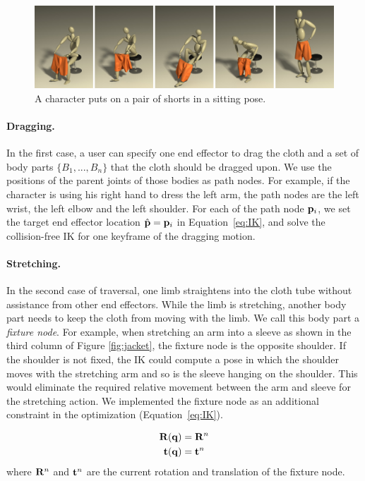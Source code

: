 \begin{figure}[!t]
  \centering
  \includegraphics[width=\textwidth]{images/shortsSitting}
  \caption{A character puts on a pair of shorts in a sitting pose.}
  \label{fig:shorts1}
\end{figure}



\paragraph{Dragging.} In the first case, a user can specify one end effector to drag the cloth and a set of body parts $\{B_1 ,..., B_n\}$ that the cloth should be dragged upon. We use the positions of the parent joints of those bodies as path nodes. For example, if the character is using his right hand to dress the left arm, the path nodes are the left wrist, the left elbow and the left shoulder. For each of the path node $\mathbf{p}_i$, we set the target end effector location $\hat{\mathbf{p}}=\mathbf{p}_i$ in Equation~\ref{eq:IK}, and solve the collision-free IK for one keyframe of the dragging motion. 

\paragraph{Stretching.} In the second case of traversal, one limb straightens into the cloth tube without assistance from other end effectors. While the limb is stretching, another body part needs to keep the cloth from moving with the limb. We call this body part a \emph{fixture node}. For example, when stretching an arm into a sleeve as shown in the third column of Figure \ref{fig:jacket}, the fixture node is the opposite shoulder. If the shoulder is not fixed, the IK could compute a pose in which the shoulder moves with the stretching arm and so is the sleeve hanging on the shoulder. This would eliminate the required relative movement between the arm and sleeve for the stretching action. We implemented the fixture node as an additional constraint in the optimization (Equation~\ref{eq:IK}).

\begin{align}
  \label{eq:fixtureNode}
  \mathbf{R}(\mathbf{q})& = \mathbf{R}^n\\
  \nonumber  \mathbf{t}(\mathbf{q})& = \mathbf{t}^n
\end{align}
where $\mathbf{R}^n$ and $\mathbf{t}^n$ are the current rotation and translation of the fixture node. 

